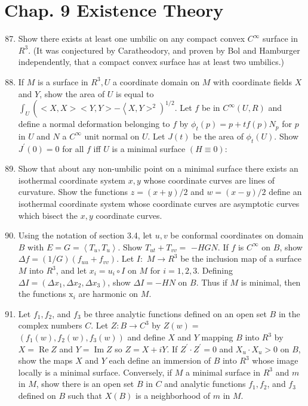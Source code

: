\documentclass[10pt]{article}
\begin{document}
\section{Chap. 9 Existence Theory}
\begin{enumerate}
  \setcounter{enumi}{86}
  \item Show there exists at least one umbilic on any compact convex $C^{\infty}$ surface in $R^{3}$. (It was conjectured by Caratheodory, and proven by Bol and Hamburger independently, that a compact convex surface has at least two umbilics.)

  \item If $M$ is a surface in $R^{3}, U$ a coordinate domain on $M$ with coordinate fields $X$ and $Y$, show the area of $U$ is equal to $\int_{U}\left(<X, X><Y, Y>-\left\langle X, Y>^{2}\right)^{1 / 2}\right.$. Let $f$ be in $C^{\infty}(U, R)$ and define a normal deformation belonging to $f$ by $\phi_{t}(p)=p+t f(p) N_{p}$ for $p$ in $U$ and $N$ a $C^{\infty}$ unit normal on $U$. Let $J(t)$ be the area of $\phi_{t}(U)$. Show $J^{\prime}(0)=0$ for all $f$ iff $U$ is a minimal surface $(H \equiv 0):$

  \item Show that about any non-umbilic point on a minimal surface there exists an isothermal coordinate system $x, y$ whose coordinate curves are lines of curvature. Show the functions $z=(x+y) / 2$ and $w=(x-y) / 2$ define an isothermal coordinate system whose coordinate curves are asymptotic curves which bisect the $x, y$ coordinate curves.

  \item Using the notation of section 3.4, let $u, v$ be conformal coordinates on domain $B$ with $E=G=\left\langle T_{u}, T_{u}\right\rangle$. Show $T_{u t}+T_{v v}=$ $-H G N .$ If $f$ is $C^{\infty}$ on $B$, show $\Delta f=(1 / G)\left(f_{u u}+f_{v v}\right)$. Let $I:$ $M \rightarrow R^{3}$ be the inclusion map of a surface $M$ into $R^{3}$, and let $x_{i}=u_{i} \circ I$ on $M$ for $i=1,2,3$. Defining $\Delta I=\left(\Delta x_{1}, \Delta x_{2}, \Delta x_{3}\right)$, show $\Delta I=-H N$ on $B$. Thus if $M$ is minimal, then the functions $\mathrm{x}_{i}$ are harmonic on $M$.

  \item Let $f_{1}, f_{2}$, and $f_{3}$ be three analytic functions defined on an open set $B$ in the complex numbers $C$. Let $Z: B \rightarrow C^{3}$ by $Z(w)=$ $\left(f_{1}(w), f_{2}(w), f_{3}(w)\right)$ and define $X$ and $Y$ mapping $B$ into $R^{3}$ by $X=\operatorname{Re} Z$ and $Y=\operatorname{Im} Z$ so $Z=X+i Y$. If $Z^{\prime} \cdot Z^{\prime}=0$ and $X_{u} \cdot X_{u}>0$ on $B$, show the maps $X$ and $Y$ each define an immersion of $B$ into $R^{3}$ whose image locally is a minimal surface. Conversely, if $M$ a minimal surface in $R^{3}$ and $m$ in $M$, show there is an open set $B$ in $C$ and analytic functions $f_{1}, f_{2}$, and $f_{3}$ defined on $B$ such that $X(B)$ is a neighborhood of $m$ in $M .$


\end{enumerate}
\end{document}
